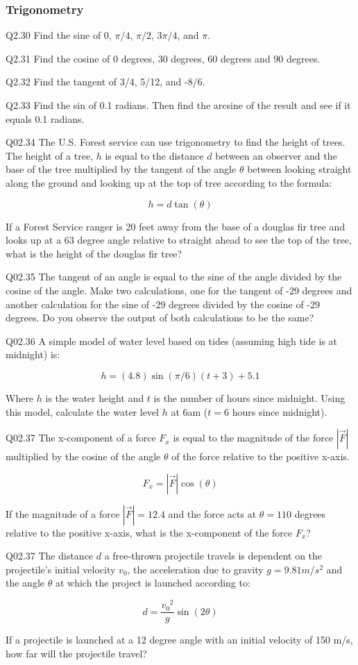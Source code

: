 \documentclass{book}
\newenvironment{problems}{}{}  %
\begin{document}
    
        \begin{problems}
        \subsubsection{Trigonometry}\label{trigonometry}

Q2.30 Find the sine of \(0\), \(\pi/4\), \(\pi/2\), \(3\pi/4\), and
\(\pi\).

Q2.31 Find the cosine of 0 degrees, 30 degrees, 60 degrees and 90
degrees.

Q2.32 Find the tangent of 3/4, 5/12, and -8/6.

Q2.33 Find the sin of 0.1 radians. Then find the arcsine of the result
and see if it equals 0.1 radians.

Q02.34 The U.S. Forest service can use trigonometry to find the height
of trees. The height of a tree, \(h\) is equal to the distance \(d\)
between an observer and the base of the tree multiplied by the tangent
of the angle \(\theta\) between looking straight along the ground and
looking up at the top of tree according to the formula:

\[ h = d\tan(\theta) \]

If a Forest Service ranger is 20 feet away from the base of a douglas
fir tree and looks up at a 63 degree angle relative to straight ahead to
see the top of the tree, what is the height of the douglas fir tree?

Q02.35 The tangent of an angle is equal to the sine of the angle divided
by the cosine of the angle. Make two calculations, one for the tangent
of -29 degrees and another calculation for the sine of -29 degrees
divided by the cosine of -29 degrees. Do you observe the output of both
calculations to be the same?

Q02.36 A simple model of water level based on tides (assuming high tide
is at midnight) is:

\[ h = (4.8)\sin(\pi/6)(t+3)+5.1 \]

Where \(h\) is the water height and \(t\) is the number of hours since
midnight. Using this model, calculate the water level \(h\) at 6am
(\(t=6\) hours since midnight).

Q02.37 The x-component of a force \(F_x\) is equal to the magnitude of
the force \(|\vec{F}|\) multiplied by the cosine of the angle \(\theta\)
of the force relative to the positive x-axis.

\[ F_x = |\vec{F}|\cos(\theta) \]

If the magnitude of a force \(|\vec{F}| = 12.4\) and the force acts at
\(\theta=110\) degrees relative to the positive x-axis, what is the
x-component of the force \(F_x\)?

Q02.37 The distance \(d\) a free-thrown projectile travels is dependent
on the projectile's initial velocity \(v_0\), the acceleration due to
gravity \(g=9.81 m/s^2\) and the angle \(\theta\) at which the project
is launched according to:

\[ d = \frac{{v_0}^2}{g} \sin(2\theta) \]

If a projectile is launched at a 12 degree angle with an initial
velocity of 150 m/s, how far will the projectile travel?
        \end{problems}
\end{document}
